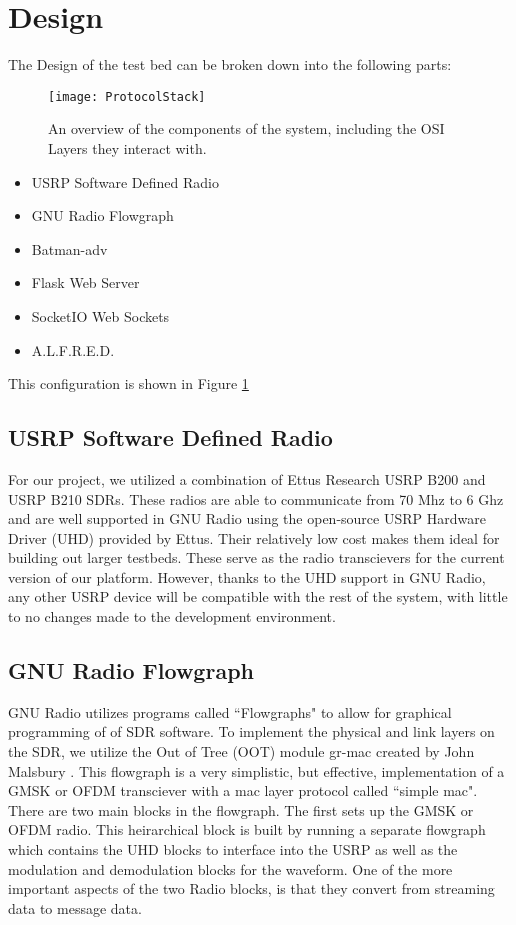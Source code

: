 \section{Design}

The Design of the test bed can be broken down into the following parts:

\begin{figure}
	\centering
	\texttt{[image: ProtocolStack]}
	\caption{An overview of the components of the system, including the OSI Layers they interact with.}
	\label{fig:ProtocolStack}
\end{figure}

\begin{itemize}
	\item USRP Software Defined Radio
	\item GNU Radio Flowgraph
	\item Batman-adv
	\item Flask Web Server
	\item SocketIO Web Sockets
	\item A.L.F.R.E.D. 
\end{itemize}

This configuration is shown in Figure \ref{fig:ProtocolStack}

\subsection{USRP Software Defined Radio}

For our project, we utilized a combination of Ettus Research USRP B200 and USRP B210 SDRs. These radios are able to communicate from 70 Mhz to 6 Ghz and are well supported in GNU Radio using the open-source USRP Hardware Driver (UHD) provided by Ettus. Their relatively low cost makes them ideal for building out larger testbeds. These serve as the radio transcievers for the current version of our platform. However, thanks to the UHD support in GNU Radio, any other USRP device will be compatible with the rest of the system, with little to no changes made to the development environment. 

\subsection{GNU Radio Flowgraph}

GNU Radio utilizes programs called ``Flowgraphs" to allow for graphical programming of of SDR software. To implement the physical and link layers on the SDR, we utilize the Out of Tree (OOT) module gr-mac created by John Malsbury \cite{0015}. This flowgraph is a very simplistic, but effective, implementation of a GMSK or OFDM transciever with a mac layer protocol called ``simple mac". There are two main blocks in the flowgraph. The first sets up the GMSK or OFDM radio. This heirarchical block is built by running a separate flowgraph which contains the UHD blocks to interface into the USRP as well as the modulation and demodulation blocks for the waveform. One of the more important aspects of the two Radio blocks, is that they convert from streaming data to message data. 


